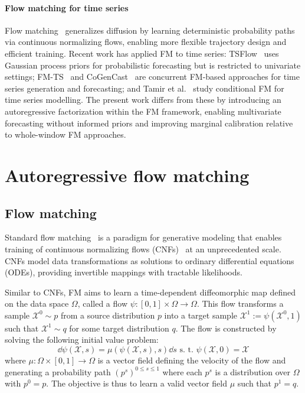 \documentclass[a4paper,10pt,twocolumn,preprint,3p]{elsarticle}
\begin{document}
{\paragraph{Flow matching for time series}
Flow matching~\citep{Lipman2022,liu2022flow,albergo2023stochastic} generalizes diffusion by learning deterministic probability paths via continuous normalizing flows, enabling more flexible trajectory design and efficient training. Recent work has applied FM to time series: TSFlow~\citep{Kerrigan2024Flow} uses Gaussian process priors for probabilistic forecasting but is restricted to univariate settings; FM-TS~\citep{Hu2024} and CoGenCast~\citep{Liu2026cogenccast} are concurrent FM-based approaches for time series generation and forecasting; and Tamir et al.~\citep{Tamir2024} study conditional FM for time series modelling. The present work differs from these by introducing an autoregressive factorization within the FM framework, enabling multivariate forecasting without informed priors and improving marginal calibration relative to whole-window FM approaches.
}

\section{Autoregressive flow matching}

\subsection{Flow matching}
Standard flow matching~\citep{Lipman2022} is a paradigm for generative modeling that enables training of continuous normalizing flows (CNFs)~\citep{chen2018neural, grathwohl2018ffjord} at an unprecedented scale. CNFs model data transformations as solutions to ordinary differential equations (ODEs), providing invertible mappings with tractable likelihoods.

Similar to CNFs, FM aims to learn a time-dependent diffeomorphic map defined on the data space $\Omega$, called a flow $\psi \colon [0, 1] \times \Omega \to \Omega$.
This flow transforms a sample $\mathcal{X}^0 \sim p$ from a source distribution $p$ into a target sample $\mathcal{X}^1 := \psi(\mathcal{X}^0, 1)$ such that $\mathcal{X}^1 \sim q$ for some target distribution $q$. The flow is constructed by solving the following initial value problem:
\begin{equation}\label{eq1}
    \dd \psi(\mathcal{X}, s
) = \mu(\psi(\mathcal{X},s
),s) \dd s \text{ s.~t. } \psi(\mathcal{X},0
) = \mathcal{X} %
\end{equation}
where $\mu \colon \Omega \times [0, 1] \to \Omega$ is a vector field defining the velocity of the flow and generating a probability path $(p^s)^{0 \leq s \leq 1}$ where each $p^s$ is a distribution over $\Omega$ with $p^0 = p$. The objective is thus to learn a valid vector field $\mu$ such that $p^1 = q$.
\end{document}
